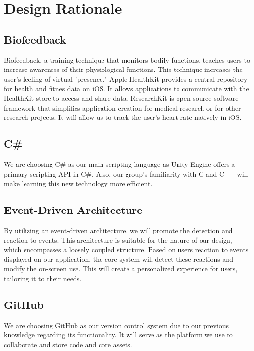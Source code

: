 \chapter{Design Rationale} %

\section{Biofeedback}
Biofeedback, a training technique that monitors bodily functions, teaches users to increase awareness of their physiological functions. This technique increases the user's feeling of virtual "presence." Apple HealthKit provides a central repository for health and fitnes data on iOS. It allows applications to communicate with the HealthKit store to access and share data. ResearchKit is open source software framework that simplifies application creation for medical research or for other research projects. It will allow us to track the user's heart rate natively in iOS.
    
\section{C\#}

We are choosing C\# as our main scripting language as Unity Engine offers a primary scripting API in C\#. Also, our group's familiarity with C and C++ will make learning this new technology more efficient.

\section{Event-Driven Architecture}

By utilizing an event-driven architecture, we will promote the detection and reaction to events. This architecture is suitable for the nature of our design, which encompasses a loosely coupled structure. Based on users reaction to events displayed on our application, the core system will detect these reactions and modify the on-screen use. This will create a personalized experience for users, tailoring it to their needs. 

\section{GitHub}

We are choosing GitHub as our version control system due to our previous knowledge regarding its functionality. It will serve as the platform we use to collaborate and store code and core assets.

